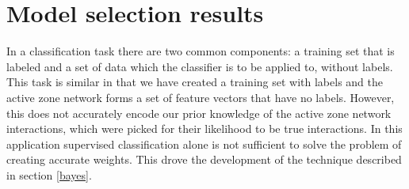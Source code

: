 %
%
%

\section{Model selection results}

In a classification task there are two common components: a training set that is labeled and a set of data which the classifier is to be applied to, without labels.
This task is similar in that we have created a training set with labels and the active zone network forms a set of feature vectors that have no labels.
However, this does not accurately encode our prior knowledge of the active zone network interactions, which were picked for their likelihood to be true interactions.
In this application supervised classification alone is not sufficient to solve the problem of creating accurate weights.
This drove the development of the technique described in section \ref{bayes}.

